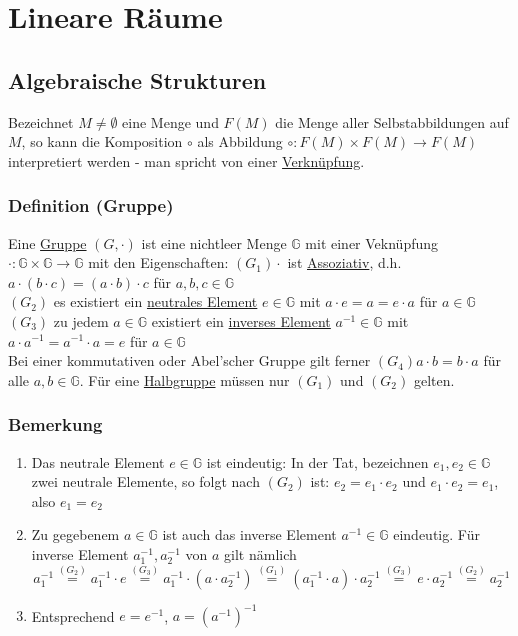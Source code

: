 \section{Lineare Räume}
\subsection{Algebraische Strukturen}
Bezeichnet $M\not=\emptyset$ eine Menge und $F(M)$ die Menge aller Selbstabbildungen auf $M$, so kann die Komposition $\circ$ als Abbildung $\circ : F(M)\times F(M) \rightarrow F(M)$ interpretiert werden - man spricht von einer \underline{Verknüpfung}.
\subsubsection{Definition (Gruppe)}
Eine \underline{Gruppe} $(G,\cdot)$ ist eine nichtleer Menge $\mathbb{G}$ mit einer Veknüpfung $\cdot:\mathbb{G}\times\mathbb{G} \rightarrow \mathbb{G}$ mit den Eigenschaften:
$(G_1) \cdot$ ist \underline{Assoziativ}, d.h. $a\cdot(b\cdot c)=(a\cdot b)\cdot c$ für $a,b,c\in \mathbb{G}$\\
$(G_2)$ es existiert ein \underline{neutrales Element} $e\in\mathbb{G}$ mit $a\cdot e=a=e\cdot a$ für $a\in\mathbb{G}$\\
$(G_3)$ zu jedem $a\in\mathbb{G}$ existiert ein \underline{inverses Element} $a^{-1}\in \mathbb{G}$ mit $a\cdot a^{-1}=a^{-1}\cdot a=e$ für $a\in \mathbb{G}$\\
Bei einer kommutativen oder Abel'scher Gruppe gilt ferner $(G_4) a\cdot b=b\cdot a$ für alle $a,b\in \mathbb{G}$.  Für eine \underline{Halbgruppe} müssen nur $(G_1)$ und $(G_2)$ gelten.
\subsubsection{Bemerkung}
\renewcommand{\labelenumi}{(\arabic{enumi})}
\begin{enumerate}
\item Das neutrale Element $e\in\mathbb{G}$ ist eindeutig: In der Tat, bezeichnen $e_1,e_2\in\mathbb{G}$ zwei neutrale Elemente, so folgt nach $(G_2)$ ist: $e_2=e_1\cdot e_2$ und $e_1\cdot e_2=e_1$, also $e_1=e_2$
\item Zu gegebenem $a\in\mathbb{G}$ ist auch das inverse Element $a^{-1}\in\mathbb{G}$ eindeutig.  Für inverse Element $a_1^{-1},a_2^{-1}$ von $a$ gilt nämlich
\[a_1^{-1}\stackrel{(G_2)}{=}a_1^{-1}\cdot e\stackrel{(G_3)}{=}a_1^{-1}\cdot(a\cdot a_2^{-1})\stackrel{(G_1)}{=}(a_1^{-1}\cdot a)\cdot a_2^{-1}\stackrel{(G_3)}{=}e\cdot a_2^{-1}\stackrel{(G_2)}{=}a_2^{-1}\]
\item Entsprechend $e=e^{-1}$, $a=(a^{-1})^{-1}$
\end{enumerate}
